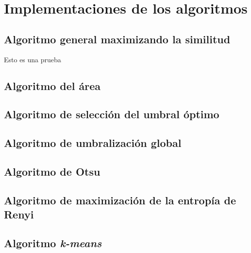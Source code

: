 \chapter{Implementaciones de los algoritmos}

\section{Algoritmo general maximizando la similitud}

\begin{listing}\label{cod:alg1}

    \caption{Esto es una prueba}
\end{listing}

\section{Algoritmo del área}
\section{Algoritmo de selección del umbral óptimo}
\section{Algoritmo de umbralización global}
\section{Algoritmo de Otsu}
\section{Algoritmo de maximización de la entropía de Renyi}
\section{Algoritmo {\em k-means}}